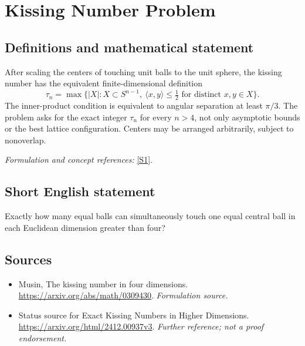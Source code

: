 \documentclass[11pt]{article}
\begin{document}
\section*{\texorpdfstring{Kissing Number Problem}{Kissing Number Problem}}\label{statement}
\subsection{Definitions and mathematical statement}
After scaling the centers of touching unit balls to the unit sphere, the kissing number has the equivalent finite-dimensional definition
\[
 \tau_n=\max\bigl\{|X|:X\subset S^{n-1},\ \langle x,y\rangle\le\tfrac12
                                  \text{ for distinct }x,y\in X\bigr\}.
\]
The inner-product condition is equivalent to angular separation at least $\pi/3$. The problem asks for the exact integer $\tau_n$ for every $n>4$, not only asymptotic bounds or the best lattice configuration. Centers may be arranged arbitrarily, subject to nonoverlap.
\par\smallskip\textit{Formulation and concept references:} \href{https://arxiv.org/abs/math/0309430}{[S1]}.

\subsection{Short English statement}
Exactly how many equal balls can simultaneously touch one equal central ball in each Euclidean dimension greater than four?
\subsection{Sources}
\begin{itemize}
\item[S1]Musin, The kissing number in four dimensions.
\url{https://arxiv.org/abs/math/0309430}.
\textit{Formulation source.}
\item[S2]Status source for Exact Kissing Numbers in Higher Dimensions.
\url{https://arxiv.org/html/2412.00937v3}.
\textit{Further reference; not a proof endorsement.}
\end{itemize}
\end{document}
